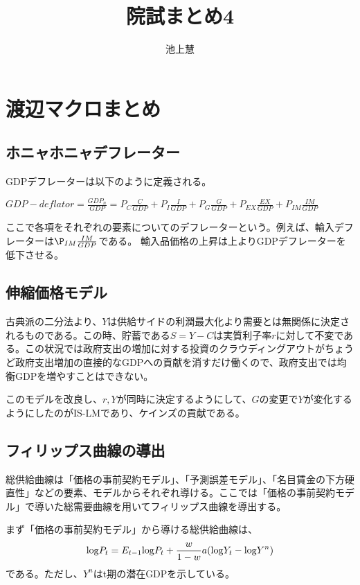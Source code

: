 \documentclass{jsarticle}
\begin{document}
\title{院試まとめ4}
\author{池上慧}
\maketitle

\section{渡辺マクロまとめ}
\subsection{ホニャホニャデフレーター}
GDPデフレーターは以下のように定義される。

$GDP-deflator = \frac{GDP_n}{GDP} = P_C\frac{C}{GDP} + P_I\frac{I}{GDP} + P_G\frac{G}{GDP} + P_{EX}\frac{EX}{GDP} + P_{IM}\frac{IM}{GDP}$

ここで各項をそれぞれの要素についてのデフレーターという。例えば、輸入デフレーターは$\P_{IM}\frac{IM}{GDP}$である。
輸入品価格の上昇は上よりGDPデフレーターを低下させる。

\subsection{伸縮価格モデル}
古典派の二分法より、$Y$は供給サイドの利潤最大化より需要とは無関係に決定されるものである。この時、貯蓄である$S = Y-C$は実質利子率$r$に対して不変である。この状況では政府支出の増加に対する投資のクラウディングアウトがちょうど政府支出増加の直接的なGDPへの貢献を消すだけ働くので、政府支出では均衡GDPを増やすことはできない。

このモデルを改良し、$r,Y$が同時に決定するようにして、$G$の変更で$Y$が変化するようにしたのがIS-LMであり、ケインズの貢献である。

\subsection{フィリップス曲線の導出}
総供給曲線は「価格の事前契約モデル」、「予測誤差モデル」、「名目賃金の下方硬直性」などの要素、モデルからそれぞれ導ける。ここでは「価格の事前契約モデル」で導いた総需要曲線を用いてフィリップス曲線を導出する。

まず「価格の事前契約モデル」から導ける総供給曲線は、
\begin{align}
	{\rm log} P_t = E_{t-1} {\rm log}P_t + \frac{w}{1 -w} a ({\rm log}Y_t - {\rm log}Y^n)
\end{align}
である。ただし、$Y^n$はt期の潜在GDPを示している。
\end{document}
